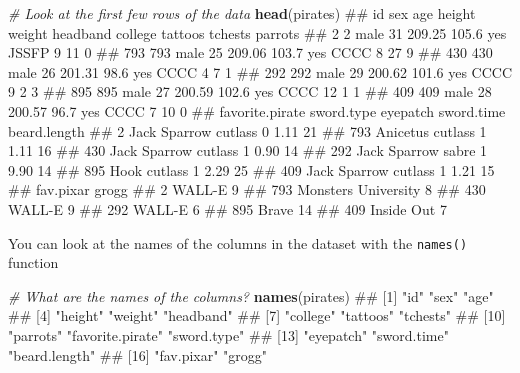 \documentclass[]{book}
\newenvironment{Shaded}{\begin{snugshade}}{\end{snugshade}}
\newcommand{\KeywordTok}[1]{\textcolor[rgb]{0.13,0.29,0.53}{\textbf{#1}}}
\newcommand{\CommentTok}[1]{\textcolor[rgb]{0.56,0.35,0.01}{\textit{#1}}}
\newcommand{\NormalTok}[1]{#1}
\theoremstyle{definition}
\theoremstyle{definition}
\theoremstyle{remark}
\begin{document}
\begin{Shaded}
\begin{Highlighting}[]
\CommentTok{# Look at the first few rows of the data}
\KeywordTok{head}\NormalTok{(pirates)}
\NormalTok{##      id  sex age height weight headband college tattoos tchests parrots}
\NormalTok{## 2     2 male  31 209.25  105.6      yes   JSSFP       9      11       0}
\NormalTok{## 793 793 male  25 209.06  103.7      yes    CCCC       8      27       9}
\NormalTok{## 430 430 male  26 201.31   98.6      yes    CCCC       4       7       1}
\NormalTok{## 292 292 male  29 200.62  101.6      yes    CCCC       9       2       3}
\NormalTok{## 895 895 male  27 200.59  102.6      yes    CCCC      12       1       1}
\NormalTok{## 409 409 male  28 200.57   96.7      yes    CCCC       7      10       0}
\NormalTok{##     favorite.pirate sword.type eyepatch sword.time beard.length}
\NormalTok{## 2      Jack Sparrow    cutlass        0       1.11           21}
\NormalTok{## 793        Anicetus    cutlass        1       1.11           16}
\NormalTok{## 430    Jack Sparrow    cutlass        1       0.90           14}
\NormalTok{## 292    Jack Sparrow      sabre        1       9.90           14}
\NormalTok{## 895            Hook    cutlass        1       2.29           25}
\NormalTok{## 409    Jack Sparrow    cutlass        1       1.21           15}
\NormalTok{##               fav.pixar grogg}
\NormalTok{## 2                WALL-E     9}
\NormalTok{## 793 Monsters University     8}
\NormalTok{## 430              WALL-E     9}
\NormalTok{## 292              WALL-E     6}
\NormalTok{## 895               Brave    14}
\NormalTok{## 409          Inside Out     7}
\end{Highlighting}
\end{Shaded}

You can look at the names of the columns in the dataset with the
\texttt{names()} function

\begin{Shaded}
\begin{Highlighting}[]
\CommentTok{# What are the names of the columns?}
\KeywordTok{names}\NormalTok{(pirates)}
\NormalTok{##  [1] "id"              "sex"             "age"            }
\NormalTok{##  [4] "height"          "weight"          "headband"       }
\NormalTok{##  [7] "college"         "tattoos"         "tchests"        }
\NormalTok{## [10] "parrots"         "favorite.pirate" "sword.type"     }
\NormalTok{## [13] "eyepatch"        "sword.time"      "beard.length"   }
\NormalTok{## [16] "fav.pixar"       "grogg"}
\end{Highlighting}
\end{Shaded}
\end{document}
